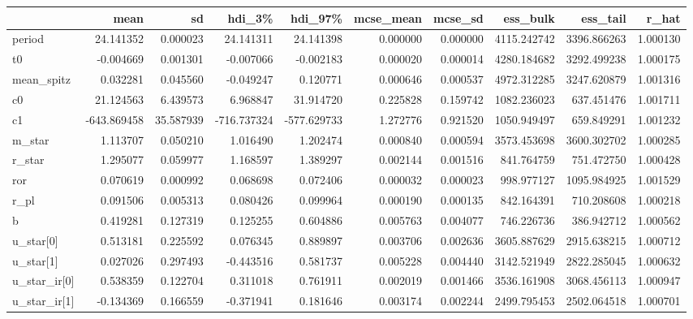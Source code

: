 \begin{tabular}{lrrrrrrrrr}
\toprule
{} &        mean &         sd &      hdi\_3\% &     hdi\_97\% &  mcse\_mean &   mcse\_sd &     ess\_bulk &     ess\_tail &     r\_hat \\
\midrule
period        &   24.141352 &   0.000023 &   24.141311 &   24.141398 &   0.000000 &  0.000000 &  4115.242742 &  3396.866263 &  1.000130 \\
t0            &   -0.004669 &   0.001301 &   -0.007066 &   -0.002183 &   0.000020 &  0.000014 &  4280.184682 &  3292.499238 &  1.000175 \\
mean\_spitz    &    0.032281 &   0.045560 &   -0.049247 &    0.120771 &   0.000646 &  0.000537 &  4972.312285 &  3247.620879 &  1.001316 \\
c0            &   21.124563 &   6.439573 &    6.968847 &   31.914720 &   0.225828 &  0.159742 &  1082.236023 &   637.451476 &  1.001711 \\
c1            & -643.869458 &  35.587939 & -716.737324 & -577.629733 &   1.272776 &  0.921520 &  1050.949497 &   659.849291 &  1.001232 \\
m\_star        &    1.113707 &   0.050210 &    1.016490 &    1.202474 &   0.000840 &  0.000594 &  3573.453698 &  3600.302702 &  1.000285 \\
r\_star        &    1.295077 &   0.059977 &    1.168597 &    1.389297 &   0.002144 &  0.001516 &   841.764759 &   751.472750 &  1.000428 \\
ror           &    0.070619 &   0.000992 &    0.068698 &    0.072406 &   0.000032 &  0.000023 &   998.977127 &  1095.984925 &  1.001529 \\
r\_pl          &    0.091506 &   0.005313 &    0.080426 &    0.099964 &   0.000190 &  0.000135 &   842.164391 &   710.208608 &  1.000218 \\
b             &    0.419281 &   0.127319 &    0.125255 &    0.604886 &   0.005763 &  0.004077 &   746.226736 &   386.942712 &  1.000562 \\
u\_star[0]     &    0.513181 &   0.225592 &    0.076345 &    0.889897 &   0.003706 &  0.002636 &  3605.887629 &  2915.638215 &  1.000712 \\
u\_star[1]     &    0.027026 &   0.297493 &   -0.443516 &    0.581737 &   0.005228 &  0.004440 &  3142.521949 &  2822.285045 &  1.000632 \\
u\_star\_ir[0]  &    0.538359 &   0.122704 &    0.311018 &    0.761911 &   0.002019 &  0.001466 &  3536.161908 &  3068.456113 &  1.000947 \\
u\_star\_ir[1]  &   -0.134369 &   0.166559 &   -0.371941 &    0.181646 &   0.003174 &  0.002244 &  2499.795453 &  2502.064518 &  1.000701 \\

\end{tabular}

